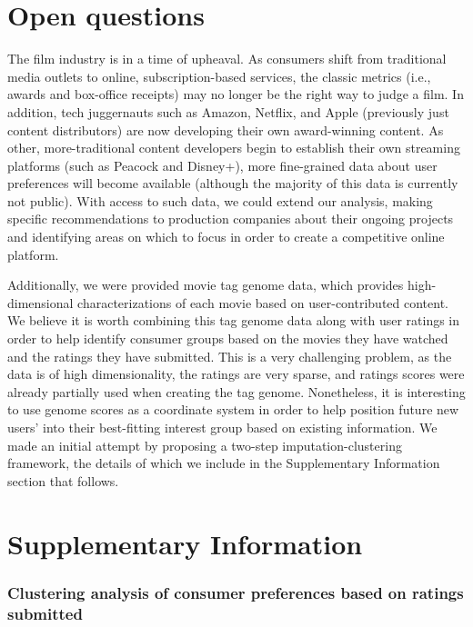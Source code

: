 \documentclass[dvipsnames]{article}
\begin{document}
\section{Open questions}

The film industry is in a time of upheaval. As consumers shift from traditional media outlets to online, subscription-based services, the classic metrics (i.e., awards and box-office receipts) may no longer be the right way to judge a film. In addition, tech juggernauts such as Amazon, Netflix, and Apple (previously just content distributors) are now developing their own award-winning content. As other, more-traditional content developers begin to establish their own streaming platforms (such as Peacock and Disney+), more fine-grained data about user preferences will become available (although the majority of this data is currently not public). With access to such data, we could extend our analysis, making specific recommendations to production companies about their ongoing projects and identifying areas on which to focus in order to create a competitive online platform.  

Additionally, we were provided movie tag genome data, which provides high-dimensional characterizations of each movie based on user-contributed content. We believe it is worth combining this tag genome data along with user ratings in order to help identify consumer groups based on the movies they have watched and the ratings they have submitted. This is a very challenging problem, as the data is of high dimensionality, the ratings are very sparse, and ratings scores were already partially used when creating the tag genome. Nonetheless, it is interesting to use genome scores as a coordinate system in order to help position future new users' into their best-fitting interest group based on existing information. We made an initial attempt by proposing a two-step imputation-clustering framework, the details of which we include in the Supplementary Information section that follows.




\section*{Supplementary Information}

\subsubsection*{Clustering analysis of consumer preferences based on ratings submitted}
\end{document}
